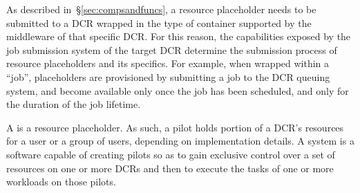 \documentclass{sig-alternate}
\begin{document}



As described in~\S\ref{sec:compsandfuncs}, a resource placeholder needs to be
submitted to a DCR wrapped in the type of container supported by the middleware
of that specific DCR. For this reason, the capabilities exposed by the job
submission system of the target DCR determine the submission process of resource
placeholders and its specifics. For example, when wrapped within a ``job'',
placeholders are provisioned by submitting a job to the DCR queuing system, and
become available only once the job has been scheduled, and only for the duration
of the job lifetime.



A \pilot is a resource placeholder. As such, a pilot holds portion of a DCR's
resources for a user or a group of users, depending on implementation details. A
\pilotjob system is a software capable of creating pilots so as to gain
exclusive control over a set of resources on one or more DCRs and then to
execute the tasks of one or more workloads on those pilots.
\end{document}
